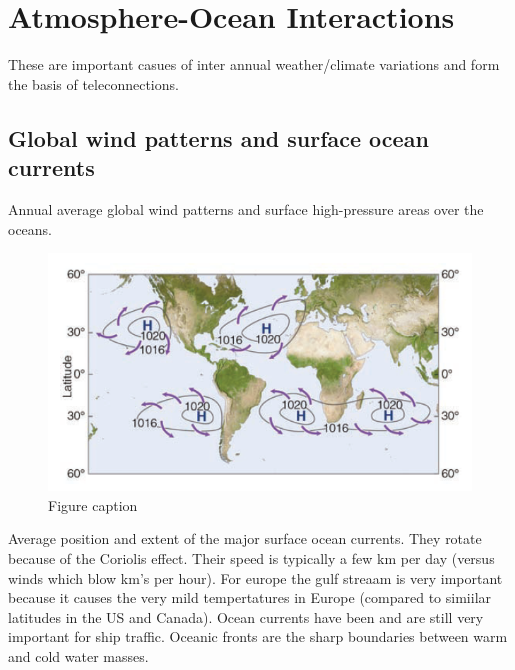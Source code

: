 \documentclass[12pt,oneside]{book}
\begin{document}
\section{Atmosphere-Ocean
Interactions}\label{atmosphere-ocean-interactions}

These are important casues of inter annual weather/climate variations
and form the basis of teleconnections.

\subsection{Global wind patterns and surface ocean
currents}\label{global-wind-patterns-and-surface-ocean-currents}

Annual average global wind patterns and surface high-pressure areas over
the oceans.

\begin{figure}

{\centering \includegraphics[width=0.8\linewidth]{figures/Figure531a} 

}

\caption{Figure caption}\label{fig:Fig531a}
\end{figure}

Average position and extent of the major surface ocean currents. They
rotate because of the Coriolis effect. Their speed is typically a few km
per day (versus winds which blow km's per hour). For europe the gulf
streaam is very important because it causes the very mild tempertatures
in Europe (compared to simiilar latitudes in the US and Canada). Ocean
currents have been and are still very important for ship traffic.
Oceanic fronts are the sharp boundaries between warm and cold water
masses.
\end{document}
